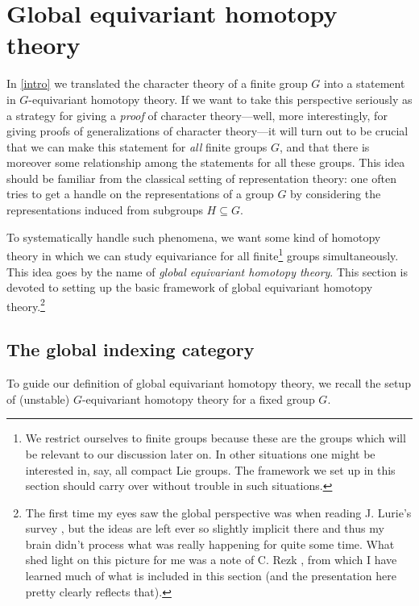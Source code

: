 \section{Global equivariant homotopy theory}
\label{global}

In \cref{intro} we translated the character theory of a finite group
$G$ into a statement in $G$-equivariant homotopy theory. If we want to
take this perspective seriously as a strategy for giving a
\emph{proof} of character theory---well, more interestingly, for
giving proofs of generalizations of character theory---it will turn
out to be crucial that we can make this statement for \emph{all}
finite groups $G$, and that there is moreover some relationship among
the statements for all these groups. This idea should be familiar from
the classical setting of representation theory: one often tries to get
a handle on the representations of a group $G$ by considering the
representations induced from subgroups $H \subseteq G$.

To systematically handle such phenomena, we want some kind of homotopy
theory in which we can study equivariance for all finite\footnote{We
  restrict ourselves to finite groups because these are the groups
  which will be relevant to our discussion later on. In other
  situations one might be interested in, say, all compact Lie
  groups. The framework we set up in this section should carry over
  without trouble in such situations.}  groups simultaneously. This
idea goes by the name of \emph{global equivariant homotopy
  theory}. This section is devoted to setting up the basic framework
of global equivariant homotopy theory.\footnote{The first time my eyes
  saw the global perspective was when reading J. Lurie's survey
  \cite{lurie-elliptic-survey}, but the ideas are left ever so
  slightly implicit there and thus my brain didn't process what was
  really happening for quite some time. What shed light on this
  picture for me was a note of C. Rezk \cite{rezk-global-cohesion},
  from which I have learned much of what is included in this section
  (and the presentation here pretty clearly reflects that).}


\subsection{The global indexing category}
\label{global-indexcat}

To guide our definition of global equivariant homotopy theory, we
recall the setup of (unstable) $G$-equivariant homotopy theory for a
fixed group $G$.

